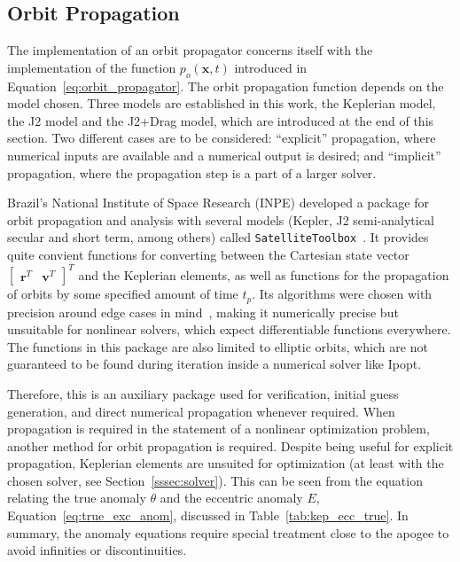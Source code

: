 \subsection{Orbit Propagation}\label{sec:orbit_propagation}

The implementation of an orbit propagator concerns itself with the implementation of the function \(p_o(\mathbf{x}, t)\) introduced in Equation~\eqref{eq:orbit_propagator}. The orbit propagation function depends on the model chosen. Three models are established in this work, the Keplerian model, the J2 model and the J2+Drag model, which are introduced at the end of this section. Two different cases are to be considered: ``explicit'' propagation, where numerical inputs are available and a numerical output is desired; and ``implicit'' propagation, where the propagation step is a part of a larger solver.

Brazil's National Institute of Space Research (INPE) developed a package for orbit propagation and analysis with several models (Kepler, J2 semi-analytical secular and short term, among others) called \texttt{SatelliteToolbox}~\cite{satellitetoolbox}. It provides quite convient functions for converting between the Cartesian state vector \(\begin{bmatrix}
    \mathbf{r}^T & \mathbf{v}^T
\end{bmatrix}^T\) and the Keplerian elements, as well as functions for the propagation of orbits by some specified amount of time \(t_p\). Its algorithms were chosen with precision around edge cases in mind~\cite{rv_to_kepler}, making it numerically precise but unsuitable for nonlinear solvers, which expect differentiable functions everywhere. The functions in this package are also limited to elliptic orbits, which are not guaranteed to be found during iteration inside a numerical solver like Ipopt.

Therefore, this is an auxiliary package used for verification, initial guess generation, and direct numerical propagation whenever required. When propagation is required in the statement of a nonlinear optimization problem, another method for orbit propagation is required. Despite being useful for explicit propagation, Keplerian elements are unsuited for optimization (at least with the chosen solver, see Section~\ref{sssec:solver}). This can be seen from the equation relating the true anomaly \(\theta\) and the eccentric anomaly \(E\), Equation~\eqref{eq:true_exc_anom}, discussed in Table~\ref{tab:kep_ecc_true}. In summary, the anomaly equations require special treatment close to the apogee to avoid infinities or discontinuities.

